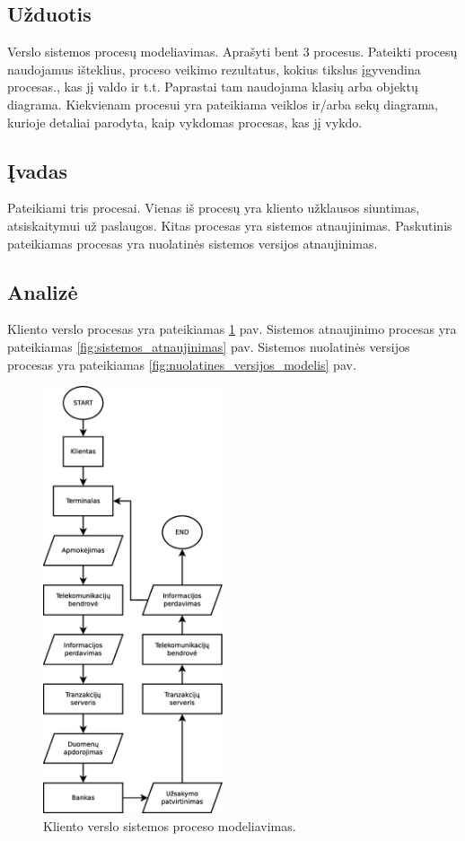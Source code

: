 \documentclass[10pt]{IEEEtran}
\begin{document}
        \subsection{Užduotis}

            Verslo sistemos procesų modeliavimas. Aprašyti bent 3 procesus. Pateikti procesų naudojamus išteklius, proceso veikimo rezultatus, kokius tikslus įgyvendina procesas., kas jį valdo ir t.t. Paprastai tam naudojama klasių arba objektų diagrama. Kiekvienam procesui yra pateikiama veiklos ir/arba sekų diagrama, kurioje detaliai parodyta, kaip vykdomas procesas, kas jį vykdo.

        \subsection{Įvadas}

            Pateikiami tris procesai. Vienas iš procesų yra kliento užklausos siuntimas, atsiskaitymui už paslaugos. Kitas procesas yra sistemos atnaujinimas. Paskutinis pateikiamas procesas yra nuolatinės sistemos versijos atnaujinimas.

        \subsection{Analizė}

            Kliento verslo procesas yra pateikiamas \ref{fig:kliento_verslo_procesas} pav. Sistemos atnaujinimo procesas yra pateikiamas \ref{fig:sistemos_atnaujinimas} pav. Sistemos nuolatinės versijos procesas yra pateikiamas \ref{fig:nuolatines_versijos_modelis} pav.

            \begin{figure}[t]
                \centering
                \includegraphics[width=200px]{figures/kliento_verslo_procesas.eps}
                \caption{Kliento verslo sistemos proceso modeliavimas.}
                \label{fig:kliento_verslo_procesas}
            \end{figure}
\end{document}
